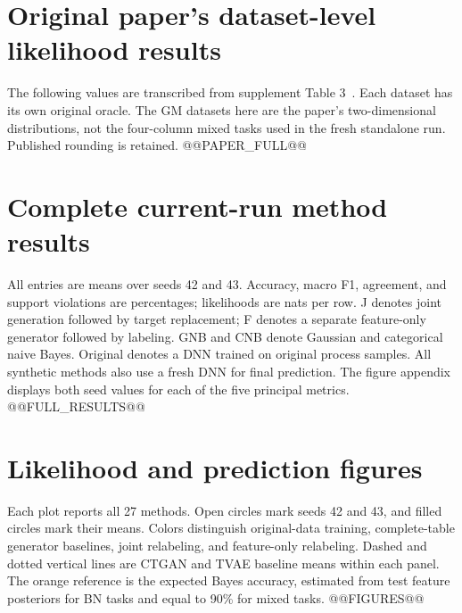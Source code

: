 \documentclass[11pt,letterpaper]{article}
\begin{document}
\clearpage
\appendix
\section{Original paper's dataset-level likelihood results}\label{app:paper}
The following values are transcribed from supplement Table 3~\cite{xusupplement}. Each dataset has its own original oracle. The GM datasets here are the paper's two-dimensional distributions, not the four-column mixed tasks used in the fresh standalone run. Published rounding is retained.
@@PAPER_FULL@@

\clearpage
\section{Complete current-run method results}\label{app:results}
All entries are means over seeds 42 and 43. Accuracy, macro F1, agreement, and support violations are percentages; likelihoods are nats per row. J denotes joint generation followed by target replacement; F denotes a separate feature-only generator followed by labeling. GNB and CNB denote Gaussian and categorical naive Bayes. Original denotes a DNN trained on original process samples. All synthetic methods also use a fresh DNN for final prediction. The figure appendix displays both seed values for each of the five principal metrics.
@@FULL_RESULTS@@

\section{Likelihood and prediction figures}\label{app:figures}
Each plot reports all 27 methods. Open circles mark seeds 42 and 43, and filled circles mark their means. Colors distinguish original-data training, complete-table generator baselines, joint relabeling, and feature-only relabeling. Dashed and dotted vertical lines are CTGAN and TVAE baseline means within each panel. The orange reference is the expected Bayes accuracy, estimated from test feature posteriors for BN tasks and equal to 90\% for mixed tasks.
@@FIGURES@@
\end{document}
